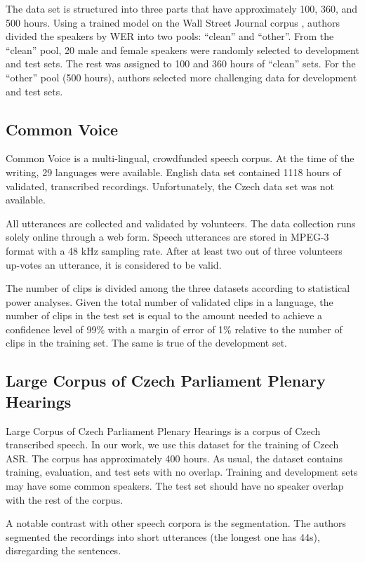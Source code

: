 The data set is structured into three parts that have approximately 100, 360, and 500 hours. Using a trained model on the Wall Street Journal corpus , authors divided the speakers by WER into two pools: ``clean'' and ``other''. From the ``clean'' pool, 20 male and female speakers were randomly selected to development and test sets. The rest was assigned to 100 and 360 hours of ``clean'' sets. For the ``other'' pool (500 hours), authors selected more challenging data for development and test sets.

\subsection{Common Voice}

Common Voice  is a multi-lingual, crowdfunded speech corpus. At the time of the writing, 29 languages were available. English data set contained 1118 hours of validated, transcribed recordings. Unfortunately, the Czech data set was not available.

All utterances are collected and validated by volunteers. The data collection runs solely online through a web form. Speech utterances are stored in MPEG-3 format with a 48 kHz sampling rate. After at least two out of three volunteers up-votes an utterance, it is considered to be valid.

The number of clips is divided among the three datasets according to statistical power analyses.  Given the total number of validated clips in a language, the number of clips in the test set is equal to the amount needed to achieve a confidence level of 99\% with a margin of error of 1\% relative to the number of clips in the training set.  The same is true of the development set.

\subsection{Large Corpus of Czech Parliament Plenary Hearings}
Large Corpus of Czech Parliament Plenary Hearings  is a corpus of Czech transcribed speech. In our work, we use this dataset for the training of Czech ASR. The corpus has approximately 400 hours. As usual, the dataset contains training, evaluation, and test sets with no overlap. Training and development sets may have some common speakers. The test set should have no speaker overlap with the rest of the corpus.

A notable contrast with other speech corpora is the segmentation. The authors segmented the recordings into short utterances (the longest one has 44s), disregarding the sentences.

